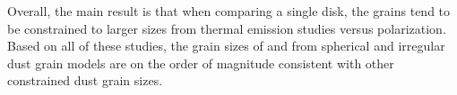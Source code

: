 Overall, the main result is that when comparing a single disk, the grains tend to be constrained to larger sizes from thermal emission studies versus polarization. Based on all of these studies, the grain sizes of \sibest and \ibest from spherical and irregular dust grain models are on the order of magnitude consistent with other constrained dust grain sizes.